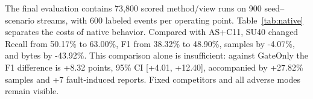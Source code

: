The final evaluation contains 73,800 scored method/view runs on 900 seed--scenario streams, with 600 labeled events per operating point. Table~\ref{tab:native} separates the costs of native behavior. Compared with AS+C11, SU40 changed Recall from 50.17\% to 63.00\%, F1 from 38.32\% to 48.90\%, samples by -4.07\%, and bytes by -43.92\%. This comparison alone is insufficient: against GateOnly the F1 difference is +8.32 points, 95\% CI [+4.01, +12.40], accompanied by +27.82\% samples and +7 fault-induced reports. Fixed competitors and all adverse modes remain visible.

